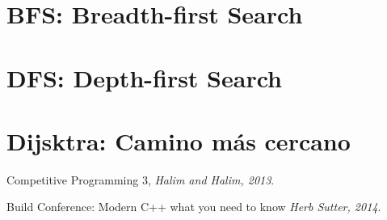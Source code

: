 \documentclass[12pt, fleqn]{report}                             %
\theoremstyle{break}                                            %
\begin{document}
        \section{BFS: Breadth-first Search}


        \section{DFS: Depth-first Search}

        \section{Dijsktra: Camino más cercano}



\begin{thebibliography}{10}

        Competitive Programming 3,
        \textit{Halim and Halim, 2013}. 


        Build Conference: Modern C++ what you need to know
        \textit{Herb Sutter, 2014}. 

\end{thebibliography}
\end{document}
